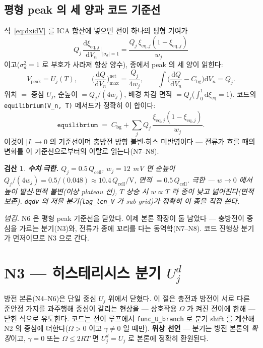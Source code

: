 \documentclass[11pt,a4paper]{article}
\newtheorem*{verifybox}{검산}
\newcommand{\dd}{\mathrm{d}}
\newcommand{\eq}{\mathrm{eq}}
\newcommand{\cell}{\mathrm{cell}}
\newcommand{\bg}{\mathrm{bg}}
\newcommand{\code}[1]{\texttt{#1}}
\begin{document}
\subsection{평형 peak 의 세 양과 코드 기준선}
식~\eqref{eq:dxidV} 를 ICA 합산에 넣으면 전이 하나의 평형 기여가
\begin{equation}
Q_j\,\frac{\dd\xi_{\eq,j}}{\dd V_n}\Big|_{|\sigma_d|=1}
=\frac{Q_j\,\xi_{\eq,j}(1-\xi_{\eq,j})}{w_j}
\label{eq:eqcontrib}
\end{equation}
이고($\sigma_d^2=1$ 로 부호가 사라져 항상 양수), 종에서 peak 의 세 양이 읽힌다:
\begin{equation}
V_\mathrm{peak}=U_j(T),\qquad
\Big(\frac{\dd Q}{\dd V_n}\Big)^\mathrm{net}_{\max}=\frac{Q_j}{4w_j},\qquad
\int\Big(\frac{\dd Q}{\dd V_n}-C_\bg\Big)\dd V_n=Q_j.
\label{eq:eqpeak}
\end{equation}
위치 $=$ 중심 $U_j$, 순높이 $=Q_j/(4w_j)$, 배경 차감 면적 $=Q_j$($\int_0^1\dd\xi_\eq=1$). 코드의 \code{equilibrium(V\_n, T)} 메서드가 정확히 이 합이다:
\begin{equation}
\code{equilibrium}\;=\;C_\bg+\sum_j Q_j\,\frac{\xi_{\eq,j}(1-\xi_{\eq,j})}{w_j}.
\label{eq:equilcode}
\end{equation}
이것이 $|I|\to0$ 의 기준선이며 충방전 방향 불변$\cdot$히스 미반영이다 — 전류가 흐를 때의 변화를 이 기준선으로부터의 이탈로 읽는다(N7--N8).

\begin{verifybox}
\textbf{수치$\cdot$극한.} $Q_j=0.5\,Q_\cell$, $w_j=12$ mV 면 순높이 $Q_j/(4w_j)=0.5/(0.048)\approx10.4\,Q_\cell/\mathrm V$, 면적 $=0.5\,Q_\cell$. 극한 — $w\to0$ 에서 높이 발산$\cdot$면적 불변(이상 plateau 선), $T$ 상승 시 $w\propto T$ 라 종이 낮고 넓어진다(면적 보존). \code{dqdv} 의 저율 분기(\code{lag\_len\_V} 가 sub-grid)가 정확히 이 종을 직접 쓴다.
\end{verifybox}

\medskip
\emph{넘김.} N6 은 평형 peak 기준선을 닫았다. 이제 본론 확장이 둘 남았다 — 충방전이 중심을 가르는 분기(N3)와, 전류가 종에 꼬리를 다는 동역학(N7--N8). 코드 진행상 분기가 먼저이므로 N3 으로 간다.

\section{N3 — 히스테리시스 분기 $U_j^d$}\label{sec:hys}
방전 본론(N4--N6)은 단일 중심 $U_j$ 위에서 닫혔다. 이 절은 충전과 방전이 서로 다른 준안정 가지를 과주행해 중심이 갈리는 현상을 — 상호작용 $\Omega$ 가 켜진 전이에 한해 — 닫힌 식으로 유도한다. 코드는 전이 루프에서 \code{func\_U\_branch} 로 분기 shift 를 계산해 N2 의 중심에 더한다($\Omega>0$ 이고 $\gamma\ne0$ 일 때만). \textbf{위상 선언} — 분기는 방전 본론의 \emph{확장}이고, $\gamma=0$ 또는 $\Omega\le2RT$ 면 $U_j^d=U_j$ 로 본론에 정확히 환원된다.
\end{document}
